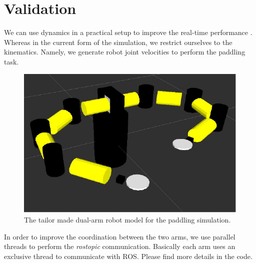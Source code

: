 \documentclass[letterpaper, 10 pt, conference]{ieeeconf}  %
\begin{document}
\section{Validation}
\label{sec:experiment}
We can use dynamics in a practical setup to improve the real-time performance \cite{nakashima2006paddle}. Whereas in the current form of the simulation, we restrict ourselves to the kinematics. Namely, we generate robot joint velocities to perform the paddling task.  

\begin{figure}[htbp]
  \begin{center}
    \includegraphics[width=1.0\columnwidth]{fig/robotModel-crop}
    \caption{
      The tailor made dual-arm robot model for the paddling simulation.
    }
     \label{fig:trajectory}
  \end{center}
\end{figure}

In order to improve the coordination between the two arms, we use parallel threads to perform the \emph{rostopic} communication. Basically each arm uses an exclusive thread to communicate with ROS. Please find more details in the code. 



\end{document}

